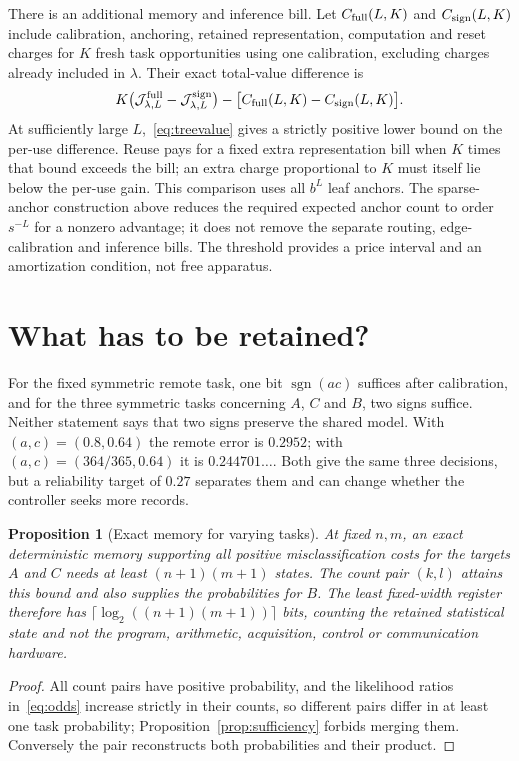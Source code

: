 \documentclass[11pt,a4paper]{article}
\newtheorem{proposition}[definition]{Proposition}
\newcommand{\sgn}{\operatorname{sgn}}
\begin{document}
There is an additional memory and inference bill. Let $C_{\rm full}(L,K)$ and $C_{\rm sign}(L,K)$ include calibration, anchoring, retained representation, computation and reset charges for $K$ fresh task opportunities using one calibration, excluding charges already included in $\lambda$. Their exact total-value difference is
\[
 K\bigl(\mathcal J^{\rm full}_{\lambda,L}
       -\mathcal J^{\rm sign}_{\lambda,L}\bigr)
       -\bigl[C_{\rm full}(L,K)-C_{\rm sign}(L,K)\bigr].
\]
At sufficiently large $L$,~\eqref{eq:treevalue} gives a strictly positive lower bound on the per-use difference. Reuse pays for a fixed extra representation bill when $K$ times that bound exceeds the bill; an extra charge proportional to $K$ must itself lie below the per-use gain. This comparison uses all $b^L$ leaf anchors. The sparse-anchor construction above reduces the required expected anchor count to order $s^{-L}$ for a nonzero advantage; it does not remove the separate routing, edge-calibration and inference bills. The threshold provides a price interval and an amortization condition, not free apparatus.

\section{What has to be retained?}\label{sec:retention}

For the fixed symmetric remote task, one bit $\sgn(ac)$ suffices after calibration, and for the three symmetric tasks concerning $A$, $C$ and $B$, two signs suffice. Neither statement says that two signs preserve the shared model. With $(a,c)=(0.8,0.64)$ the remote error is $0.2952$; with $(a,c)=(364/365,0.64)$ it is $0.244701\ldots$. Both give the same three decisions, but a reliability target of $0.27$ separates them and can change whether the controller seeks more records.

\begin{proposition}[Exact memory for varying tasks]\label{prop:memorysize}
At fixed $n,m$, an exact deterministic memory supporting all positive misclassification costs for the targets $A$ and $C$ needs at least $(n+1)(m+1)$ states. The count pair $(k,l)$ attains this bound and also supplies the probabilities for $B$. The least fixed-width register therefore has $\lceil\log_2((n+1)(m+1))\rceil$ bits, counting the retained statistical state and not the program, arithmetic, acquisition, control or communication hardware.
\end{proposition}
\begin{proof}
All count pairs have positive probability, and the likelihood ratios in~\eqref{eq:odds} increase strictly in their counts, so different pairs differ in at least one task probability; Proposition~\ref{prop:sufficiency} forbids merging them. Conversely the pair reconstructs both probabilities and their product.
\end{proof}
\end{document}

